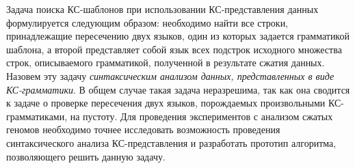 Задача поиска КС-шаблонов при использовании КС-представления данных формулируется следующим образом: необходимо найти все строки, принадлежащие пересечению двух языков, один из которых задается грамматикой шаблона, а второй представляет собой язык всех подстрок исходного множества строк, описываемого грамматикой, полученной в результате сжатия данных.
Назовем эту задачу \textit{синтаксическим анализом данных, представленных в виде КС-грамматики}.
В общем случае такая задача неразрешима, так как она сводится к задаче о проверке пересечения двух языков, порождаемых произвольными КС-грамматиками, на пустоту. 
Для проведения экспериментов с анализом сжатых геномов необходимо точнее исследовать возможность проведения синтаксического анализа КС-представления и разработать прототип алгоритма, позволяющего решить данную задачу.
